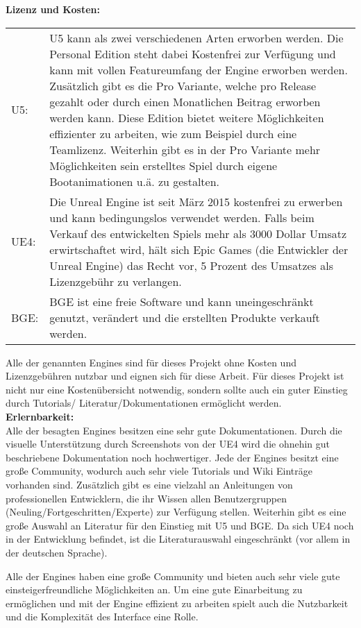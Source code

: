 \textbf{Lizenz und Kosten:}
\begin{table}[H]
\centering
\renewcommand{\arraystretch}{1.5}
\begin{tabular}{lp{14.5cm}}
\ac{U5}: & \ac{U5} kann als zwei verschiedenen Arten erworben werden. Die Personal Edition steht dabei Kostenfrei zur Verfügung und kann mit vollen Featureumfang der Engine erworben werden. Zusätzlich gibt es die Pro Variante, welche pro Release gezahlt oder durch einen Monatlichen Beitrag erworben werden kann. Diese Edition bietet weitere Möglichkeiten effizienter zu arbeiten, wie zum Beispiel durch eine Teamlizenz. Weiterhin gibt es in der Pro Variante mehr Möglichkeiten sein erstelltes Spiel durch eigene Bootanimationen u.ä. zu gestalten.\\
UE4:& Die Unreal Engine ist seit März 2015 kostenfrei zu erwerben und kann bedingungslos verwendet werden. Falls beim Verkauf des entwickelten Spiels mehr als 3000 Dollar Umsatz erwirtschaftet wird, hält sich Epic Games (die Entwickler der Unreal Engine) das Recht vor, 5 Prozent des Umsatzes als Lizenzgebühr zu  verlangen.\\
\ac{BGE}: & \ac{BGE} ist eine freie Software  und kann uneingeschränkt genutzt, verändert und die erstellten Produkte verkauft werden.
\end{tabular}
\end{table}
Alle der genannten Engines sind für dieses Projekt ohne Kosten und Lizenzgebühren nutzbar und eignen sich für diese Arbeit.
Für dieses Projekt ist nicht nur eine Kostenübersicht notwendig, sondern sollte auch ein guter Einstieg durch Tutorials/ Literatur/Dokumentationen ermöglicht werden. \\

\textbf{Erlernbarkeit:}\\
Alle der besagten Engines besitzen eine sehr gute Dokumentationen. Durch die visuelle Unterstützung durch Screenshots von der \ac{UE4}  wird die ohnehin gut beschriebene Dokumentation noch hochwertiger. Jede der Engines besitzt eine große Community, wodurch auch sehr viele Tutorials und Wiki Einträge vorhanden sind. Zusätzlich gibt es eine  vielzahl an  Anleitungen von professionellen Entwicklern, die ihr Wissen allen Benutzergruppen (Neuling/Fortgeschritten/Experte) zur Verfügung stellen. Weiterhin gibt es eine große Auswahl an Literatur für den Einstieg mit \ac{U5} und \ac{BGE}. Da sich \ac{UE4} noch in der Entwicklung befindet, ist die Literaturauswahl eingeschränkt (vor allem in der deutschen Sprache).

Alle der Engines haben eine große Community und bieten auch sehr viele gute einsteigerfreundliche Möglichkeiten an. 
Um eine gute Einarbeitung zu ermöglichen und mit der Engine effizient zu arbeiten spielt auch die Nutzbarkeit und die Komplexität des Interface eine Rolle.\\

